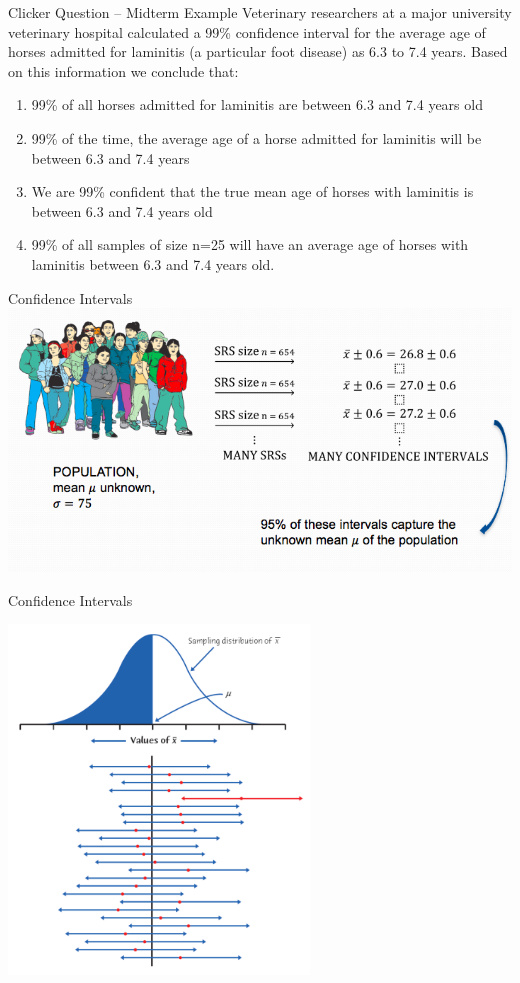 \documentclass{beamer}
\begin{document}
\begin{frame}{Clicker Question -- Midterm Example}
	Veterinary researchers at a major university veterinary hospital calculated a 99\% confidence interval for the average age of horses admitted for laminitis (a particular foot disease) as 6.3 to 7.4 years. Based on this information we conclude that:
	
	\begin{enumerate}[label=(\alph*)]
		\item 99\% of all horses admitted for laminitis are between 6.3 and 7.4 years old
		\item 99\% of the time, the average age of a horse admitted for laminitis will be between 6.3 and 7.4 years
		\item We are 99\% confident that the true mean age of horses with laminitis is between 6.3 and 7.4 years old
		\item 99\% of all samples of size n=25 will have an average age of horses with laminitis between 6.3 and 7.4 years old.
	\end{enumerate}
\end{frame}



\begin{frame}{Confidence Intervals}
	\includegraphics[width=\textwidth]{ci_pic}
\end{frame}

\begin{frame}{Confidence Intervals}
	\begin{center}
		\includegraphics[width=0.6\textwidth]{repeatedci}
	\end{center}
\end{frame}
\end{document}
